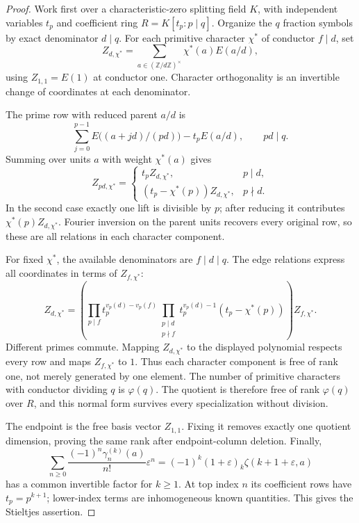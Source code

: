 \begin{proof}
Work first over a characteristic-zero splitting field $K$, with
independent variables $t_p$ and coefficient ring $R=K[t_p:p\mid q]$.
Organize the $q$ fraction symbols by exact denominator $d\mid q$.
For each primitive character $\chi^*$ of conductor $f\mid d$, set
\[
 Z_{d,\chi^*}=\sum_{a\in(\mathbb Z/d\mathbb Z)^\times}
       \chi^*(a)E(a/d),
\]
using $Z_{1,1}=E(1)$ at conductor one. Character orthogonality is an
invertible change of coordinates at each denominator.

The prime row with reduced parent $a/d$ is
\[
 \sum_{j=0}^{p-1}E\bigl((a+jd)/(pd)\bigr)-t_pE(a/d),
 \qquad pd\mid q.
\]
Summing over units $a$ with weight $\chi^*(a)$ gives
\[
 Z_{pd,\chi^*}=\begin{cases}
 t_pZ_{d,\chi^*},&p\mid d,\\
 (t_p-\chi^*(p))Z_{d,\chi^*},&p\nmid d.
 \end{cases}
\]
In the second case exactly one lift is divisible by $p$; after reducing
it contributes $\chi^*(p)Z_{d,\chi^*}$. Fourier inversion on the parent
units recovers every original row, so these are all relations in each
character component.

For fixed $\chi^*$, the available denominators are $f\mid d\mid q$.
The edge relations express all coordinates in terms of $Z_{f,\chi^*}$:
\[
 Z_{d,\chi^*}=\left(
 \prod_{p\mid f}t_p^{v_p(d)-v_p(f)}
 \prod_{\substack{p\mid d\\p\nmid f}}
 t_p^{v_p(d)-1}(t_p-\chi^*(p))\right)Z_{f,\chi^*}.
\]
Different primes commute. Mapping $Z_{d,\chi^*}$ to the displayed
polynomial respects every row and maps $Z_{f,\chi^*}$ to $1$.
Thus each character component is free of rank one, not merely generated
by one element. The number of primitive characters with conductor dividing
$q$ is $\varphi(q)$. The quotient is therefore free of rank $\varphi(q)$
over $R$, and this normal form survives every specialization without division.

The endpoint is the free basis vector $Z_{1,1}$. Fixing it removes exactly
one quotient dimension, proving the same rank after endpoint-column deletion.
Finally,
\[
 \sum_{n\ge0}\frac{(-1)^n\gamma_n^{(k)}(a)}{n!}\varepsilon^n
 =(-1)^k(1+\varepsilon)_k\zeta(k+1+\varepsilon,a)
\]
has a common invertible factor for $k\ge1$. At top index $n$ its
coefficient rows have $t_p=p^{k+1}$; lower-index terms are inhomogeneous
known quantities. This gives the Stieltjes assertion.
\end{proof}

